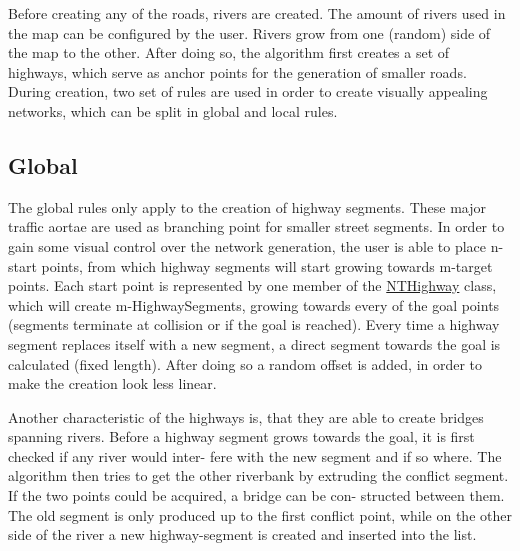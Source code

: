 Before creating any of the roads, rivers are created. The amount of rivers used in the map can be configured by the user. Rivers grow from one (random) side of the map to the other. After doing so, the algorithm first creates a set of highways, which serve as anchor points for the generation of smaller roads. During creation, two set of rules are used in order to create visually appealing networks, which can be split in global and local rules.\hypertarget{index_Global}{}\subsection{Global}\label{index_Global}
The global rules only apply to the creation of highway segments. These major traffic aortae are used as branching point for smaller street segments. In order to gain some visual control over the network generation, the user is able to place n-\/start points, from which highway segments will start growing towards m-\/target points. Each start point is represented by one member of the \hyperlink{class_n_t_highway}{N\+T\+Highway} class, which will create m-\/\+Highway\+Segments, growing towards every of the goal points (segments terminate at collision or if the goal is reached). Every time a highway segment replaces itself with a new segment, a direct segment towards the goal is calculated (fixed length). After doing so a random offset is added, in order to make the creation look less linear.



Another characteristic of the highways is, that they are able to create bridges spanning rivers. Before a highway segment grows towards the goal, it is first checked if any river would inter-\/ fere with the new segment and if so where. The algorithm then tries to get the other riverbank by extruding the conflict segment. If the two points could be acquired, a bridge can be con-\/ structed between them. The old segment is only produced up to the first conflict point, while on the other side of the river a new highway-\/segment is created and inserted into the list.

